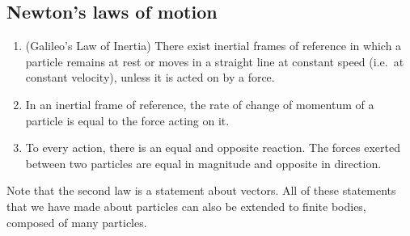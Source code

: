\subsection{Newton's laws of motion}
\begin{enumerate}
	\item (Galileo's Law of Inertia) There exist inertial frames of reference in which a particle remains at rest or moves in a straight line at constant speed (i.e.\ at constant velocity), unless it is acted on by a force.
	\item In an inertial frame of reference, the rate of change of momentum of a particle is equal to the force acting on it.
	\item To every action, there is an equal and opposite reaction.
	      The forces exerted between two particles are equal in magnitude and opposite in direction.
\end{enumerate}
Note that the second law is a statement about vectors.
All of these statements that we have made about particles can also be extended to finite bodies, composed of many particles.
